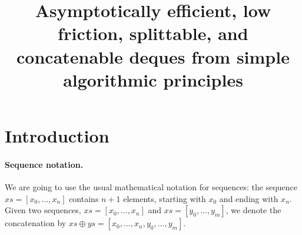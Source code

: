 \documentclass[10pt]{article}
\title{Asymptotically efficient, low friction, splittable, and concatenable deques from simple algorithmic principles}
\author{}
\begin{document}
\maketitle

\section{Introduction}


\paragraph{Sequence notation.} We are going to use the usual mathematical
notation for sequences: the sequence $xs = [x_0, \ldots, x_n]$
contains $n + 1$ elements, starting with $x_0$ and ending with
$x_n$. Given two sequences, $xs = [x_0, \ldots, x_n]$ and $xs = [y_0,
  \ldots, y_m]$, we denote the concatenation by $xs \oplus ys = [x_0,
  \ldots, x_n, y_0, \ldots, y_m]$.
\end{document}
